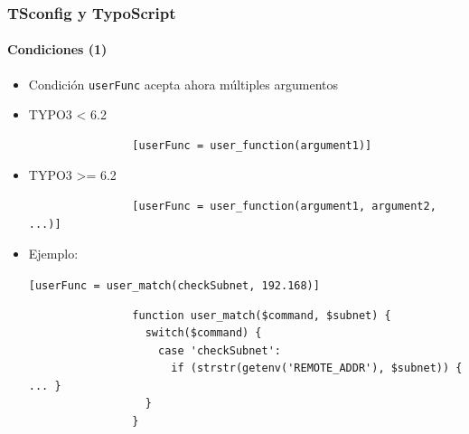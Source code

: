 \begin{frame}[fragile]
	\frametitle{TSconfig y TypoScript}
	\framesubtitle{Condiciones (1)}

	\begin{itemize}
		\item Condición \texttt{userFunc} acepta ahora múltiples argumentos

		\item TYPO3 < 6.2
			\begin{lstlisting}
				[userFunc = user_function(argument1)]
			\end{lstlisting}

		\item TYPO3 >= 6.2
			\begin{lstlisting}
				[userFunc = user_function(argument1, argument2, ...)]
			\end{lstlisting}

		\item Ejemplo:

			\lstinline![userFunc = user_match(checkSubnet, 192.168)]!

			\begin{lstlisting}
				function user_match($command, $subnet) {
				  switch($command) {
				    case 'checkSubnet':
				      if (strstr(getenv('REMOTE_ADDR'), $subnet)) { ... }
				  }
				}
			\end{lstlisting}

	\end{itemize}

\end{frame}


